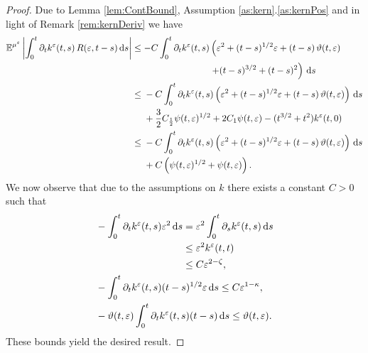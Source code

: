 \documentclass[10pt]{article}
\begin{document}
\begin{proof} Due to Lemma \ref{lem:ContBound}, Assumption \ref{as:kern}.\ref{as:kernPos} and in light of Remark \ref{rem:kernDeriv} we have
	\begin{equation}
	\begin{aligned}
	\operatorname{\mathbb{E}}^{\mu^\varepsilon} \left\lvert\int_0^t \partial_t k^\varepsilon(t, s) \, R(\varepsilon, t-s) \,\mathrm{d} s\right\rvert &\leq
	\begin{aligned}[t]
	- C \int_0^t \partial_tk^\varepsilon(t, s) &\left(\varepsilon^2 + (t-s)^{1/2}\varepsilon + (t-s)\,\vartheta(t, \varepsilon)\right.\\
	&\left. + (t-s)^{3/2} + (t-s)^2 \right) \,\mathrm{d} s
	\end{aligned}
	\\
	&\leq 
	\begin{aligned}[t]
	&- C \int_0^t \partial_tk^\varepsilon(t, s) \left(\varepsilon^2 + (t-s)^{1/2}\varepsilon + (t-s)\,\vartheta(t, \varepsilon)\right) \,\mathrm{d} s\\
	&+ \frac{3}{2} C_{\frac{1}{2}} \psi(t, \varepsilon)^{1/2} + 2 C_{1} \psi(t, \varepsilon) - (t^{3/2} + t^2) k^{\varepsilon}(t, 0)
	\end{aligned}
	\\
	&\leq 
	\begin{aligned}[t]
	&- C \int_0^t \partial_tk^\varepsilon(t, s) \left(\varepsilon^2 + (t-s)^{1/2}\varepsilon + (t-s)\,\vartheta(t, \varepsilon)\right) \,\mathrm{d} s\\
	&+ C \left( \psi(t, \varepsilon)^{1/2} + \psi(t, \varepsilon)\right).
	\end{aligned}
	\end{aligned}
	\end{equation}
	We now observe that due to the assumptions on $k$ there exists a constant $C > 0$ such that 
	\begin{equation}
	\begin{aligned}
	& -\int_0^t \partial_tk^\varepsilon(t, s) \varepsilon^2 \,\mathrm{d} s 
	\begin{aligned}[t]
	&= \varepsilon^2 \int_0^t \partial_s k^\varepsilon(t, s) \,\mathrm{d} s\\
	&\leq \varepsilon^2 k^\varepsilon(t, t) \\
	&\leq C\varepsilon^{2-\zeta}, 
	\end{aligned}
	\\
	& -\int_0^t \partial_tk^\varepsilon(t, s)(t-s)^{1/2} \varepsilon \,\mathrm{d} s \leq C \varepsilon^{1-\kappa},\\
	& -\vartheta(t, \varepsilon) \int_0^t \partial_tk^\varepsilon(t, s)(t-s) \,\mathrm{d} s \leq \vartheta(t, \varepsilon).
	\end{aligned}
	\end{equation}
	These bounds yield the desired result.
\end{proof}
\end{document}
